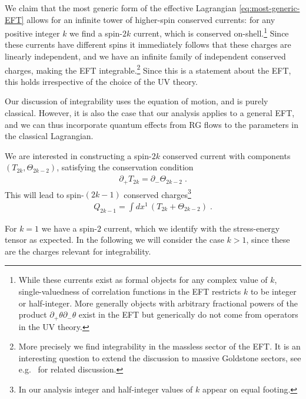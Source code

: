 \documentclass[12pt]{article}
\begin{document}
We claim that the most generic form of the effective Lagrangian \eqref{eq:most-generic-EFT} allows for an infinite tower of higher-spin conserved currents:
for any positive integer $k$ we find a spin-$2k$ current, which is conserved on-shell.\footnote{While these currents exist as formal objects for any complex value of $k$, single-valuedness of correlation functions in the EFT restricts $k$ to be integer or half-integer.  More generally objects with arbitrary fractional powers of the product $\partial_+\theta \partial_-\theta$ exist in the EFT but generically do not come from operators in the UV theory.  }
Since these currents have different spins it immediately follows that these charges are linearly independent,
and we have an infinite family of independent conserved charges, making the EFT integrable.\footnote{More precisely we find integrability in the massless sector of the EFT. It is an interesting question to extend the discussion to massive Goldstone sectors, see e.g.\ \cite{Watanabe:2013uya,Cuomo:2020gyl} for related discussion.}
Since this is a statement about the EFT,
this holds irrespective of the choice of the UV theory.

Our discussion of integrability uses the equation of motion, and is purely classical.
However, it is also the case that our analysis applies to a general EFT,
and we can thus incorporate quantum effects from RG flows to the 
parameters in the classical Lagrangian.

We are interested in constructing a spin-$2k$ conserved current 
with components $(T_{2k}, \Theta_{2k-2})$, 
satisfying the conservation condition
\begin{align}
    \partial_{+} T_{2k} = \partial_{-}\Theta_{2k-2} \;.
    \label{eq:conservation}
\end{align}
This will lead to spin-$(2k-1)$ conserved charges\footnote{In our analysis integer and half-integer values of $k$ appear on equal footing.}
\begin{align}
Q_{2k-1} = \int dx^1\, \left(T_{2k}
 + \Theta_{2k-2} \right) \;.
\end{align}

For $k=1$ we have a spin-$2$ current, which we identify with the stress-energy tensor as expected.
In the following we will consider the case $k>1$, since these are the charges relevant for integrability.
\end{document}
